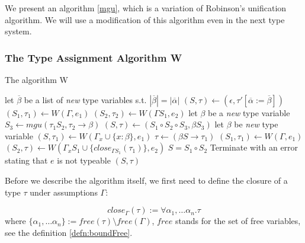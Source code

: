 We present an algorithm \ref{mgu}, which is a variation of Robinson's unification algorithm. We will use a modification of this algorithm even in the next type system.

\subsubsection{The Type Assignment Algorithm W}

\begin{algorithm}[t]
\caption{The algorithm W \cite{milner1978theory}}
\label{w}
\begin{algorithmic}[1]
    \State let $\overline{\beta}$ be a list of \emph{new} type variables s.t. $|\overline{\beta}| = |\overline{\alpha}|$
    \State $(S, \tau) \gets (\epsilon, \tau' [\overline{\alpha} := \overline{\beta}])$
    \State $(S_1, \tau_1) \gets W(\Gamma, e_1)$
    \State $(S_2, \tau_2) \gets W(\Gamma S_1, e_2)$
    \State let $\beta$ be a \emph{new} type variable
    \State $S_3 \gets mgu (\tau_1 S_2, \tau_2 \rightarrow \beta)$
    \State $(S, \tau) \gets (S_1 \circ S_2 \circ S_3, \beta S_3)$
    \State let $\beta$ be \emph{new} type variable
    \State $(S, \tau_1) \gets W(\Gamma_x \cup \{x : \beta\}, e_1)$
    \State $\tau \gets (\beta S \rightarrow \tau_1)$
    \State $(S_1, \tau_1) \gets W(\Gamma, e_1)$
    \State $(S_2, \tau) \gets W(\Gamma_x S_1 \cup \{close_{\Gamma S_1}(\tau_1)\}, e_2)$
    \State $S = S_1 \circ S_2$
    \Else
    \State Terminate with an error stating that $e$ is not typeable
    \EndIf
    \State \Return $(S, \tau)$
\EndFunction
\end{algorithmic}
\end{algorithm}

Before we describe the algorithm itself, we first need to define the closure of a type $\tau$ under assumptions $\Gamma$:

\begin{defn}
    \label{defn:close}
    $$close_\Gamma(\tau) := \forall \alpha_1, \dots \alpha_n . \tau$$
    where $\{\alpha_1, \dots \alpha_n\} := free(\tau) \setminus free(\Gamma)$, $free$ stands for the set of free variables, see the definition \ref{defn:boundFree}.
\end{defn}

